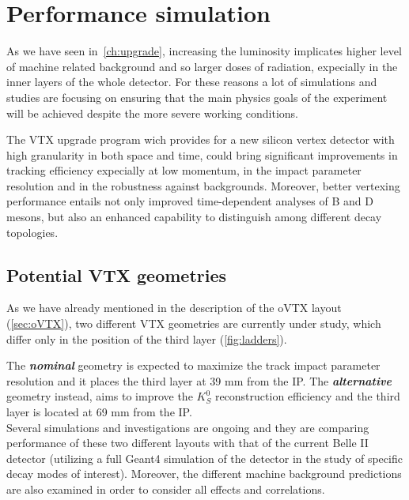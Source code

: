 \section{Performance simulation}


As we have seen in~\autoref{ch:upgrade}, increasing the luminosity implicates higher level of machine related background and so larger doses of radiation, expecially in the inner layers of the whole detector. 
For these reasons a lot of simulations and studies are focusing on ensuring that the main physics goals of the experiment will be achieved despite the more severe working conditions. 

The VTX upgrade program wich provides for a new silicon vertex detector with high granularity in both space and time, could bring significant improvements in tracking efficiency expecially at low momentum, in the impact parameter resolution and in the robustness against backgrounds. Moreover, better vertexing performance entails not only improved time-dependent analyses of B and D mesons, but also an enhanced capability to distinguish among different decay topologies.


\subsection{Potential VTX geometries}

As we have already mentioned in the description of the oVTX layout (\autoref{sec:oVTX}), two different VTX geometries are currently under study, which differ only in the position of the third layer (\autoref{fig:ladders}).  

The \textit{\textbf{nominal}} geometry is expected to maximize the track impact parameter resolution and it places the third layer at 39 mm from the IP.
The \textit{\textbf{alternative}} geometry instead, aims to improve the $K_{S}^{0}$ reconstruction efficiency and the third layer is located at 69 mm from the IP.\\

Several simulations and investigations are ongoing and they are comparing performance of these two different layouts with that of the current Belle II detector (utilizing a full Geant4 simulation of the detector in the study of specific decay modes of interest). Moreover, the different machine background predictions are also examined in order to consider all effects and correlations. 

